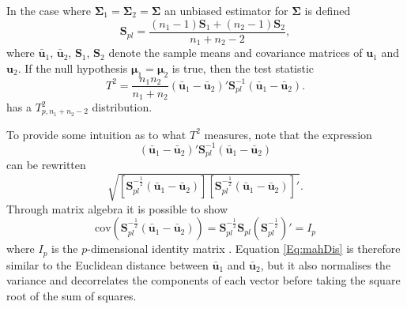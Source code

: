 \documentclass[12pt]{book}
\begin{document}
In the case where $\boldsymbol{\Sigma}_1=\boldsymbol{\Sigma}_2=\boldsymbol{\Sigma}$ an unbiased estimator for $\boldsymbol{\Sigma}$ is defined
\begin{equation}
\boldsymbol{S}_{pl}=\frac{(n_1-1)\boldsymbol{S}_1+(n_2-1)\boldsymbol{S}_2}{n_1+n_2-2},
\end{equation}
where $\bar{\boldsymbol{u}}_1$, $\bar{\boldsymbol{u}}_2$, $\boldsymbol{S}_1$, $\boldsymbol{S}_2$ denote the sample means and covariance matrices of $\boldsymbol{u}_1$ and $\boldsymbol{u}_2$. If the null hypothesis $\boldsymbol{\mu}_1=\boldsymbol{\mu}_2$ is true, then the test statistic
$$T^2=\frac{n_1n_2}{n_1+n_2}(\bar{\boldsymbol{u}}_1-\bar{\boldsymbol{u}}_2)'\boldsymbol{S}_{pl}^{-1}(\bar{\boldsymbol{u}}_1-\bar{\boldsymbol{u}}_2).$$
has a $T^2_{p,n_1+n_2-2}$ distribution. 

To provide some intuition as to what $T^2$ measures, note that the expression 
\begin{equation}
(\bar{\boldsymbol{u}}_1-\bar{\boldsymbol{u}}_2)'\boldsymbol{S}_{pl}^{-1}(\bar{\boldsymbol{u}}_1-\bar{\boldsymbol{u}}_2) \label{Eq:mahDis}
\end{equation}
can be rewritten
\begin{equation}
\sqrt{\left[\boldsymbol{S}_{pl}^{-\frac{1}{2}}(\bar{\boldsymbol{u}}_1-\bar{\boldsymbol{u}}_2)\right]\left[\boldsymbol{S}_{pl}^{-\frac{1}{2}}(\bar{\boldsymbol{u}}_1-\bar{\boldsymbol{u}}_2)\right]'}.
\end{equation}
Through matrix algebra it is possible to show
\begin{equation}
\text{cov}\left(\boldsymbol{S}_{pl}^{-\frac{1}{2}}(\bar{\boldsymbol{u}}_1-\bar{\boldsymbol{u}}_2)\right)=\boldsymbol{S}_{pl}^{-\frac{1}{2}}\boldsymbol{S}_{pl}\left(\boldsymbol{S}_{pl}^{-\frac{1}{2}}\right)'
=I_p 
\end{equation}
where $I_p$ is the $p$-dimensional identity matrix \citep[p. 77]{rencher02}. Equation \ref{Eq:mahDis} is therefore similar to the Euclidean distance between $\bar{\boldsymbol{u}}_1$ and $\bar{\boldsymbol{u}}_2$, but it also normalises the variance and decorrelates the components of each vector before taking the square root of the sum of squares. 
\end{document}
